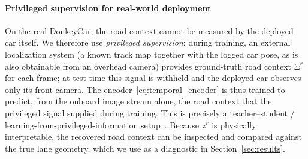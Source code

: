 \documentclass[preprint,12pt]{elsarticle}
\newcommand{\zr}{z^{r}}      %
\begin{document}
\paragraph{Privileged supervision for real-world deployment}
On the real DonkeyCar, the road context cannot be measured by the deployed car
itself.
We therefore use \emph{privileged supervision}: during training, an external
localization system (a known track map together with the logged car pose, as is
also obtainable from an overhead camera) provides ground-truth road context
$\Xi^r$ for each frame; at test time this signal is withheld and the deployed car
observes only its front camera.
The encoder~\eqref{eq:temporal_encoder} is thus trained to predict, from the
onboard image stream alone, the road context that the privileged signal supplied
during training.
This is precisely a teacher--student / learning-from-privileged-information
setup~\cite{chen2020learning}.
Because $\zr$ is physically interpretable, the recovered road context can be
inspected and compared against the true lane geometry, which we use as a
diagnostic in Section~\ref{sec:results}.
\end{document}
